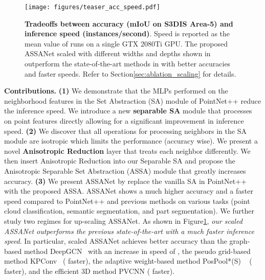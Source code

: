 \documentclass{article}
\newcommand{\figLabel}{Figure\xspace}
\newcommand{\secLabel}{Section\xspace}
\newcommand{\mysection}[1]{\vspace{3pt}\noindent\textbf{#1.}}
\begin{document}
\begin{figure}
  \begin{minipage}[c]{0.40\textwidth}
    \texttt{[image: figures/teaser\_acc\_speed.pdf]}
  \end{minipage}\hfill
  \begin{minipage}[c]{0.50\textwidth}
    \caption{
        \textbf{Tradeoffs between accuracy (mIoU on S3DIS Area-5) and inference speed (instances/second)}. Speed is reported as the mean value of  runs on a single GTX 2080Ti GPU. The proposed ASSANet scaled with different widths and depths shown in \protect{} outperform the state-of-the-art methods in \protect{} with better accuracies and faster speeds. Refer to \secLabel \ref{sec:ablation_scaling} for details. 
    }
    \label{fig:acc-latency}
  \end{minipage}
  \vspace{-5mm}
\end{figure}


\mysection{Contributions}
\textbf{(1)} We demonstrate that the MLPs performed on the neighborhood features in the Set Abstraction (SA) module of PointNet++ reduce the inference speed. We introduce a new \textbf{separable SA} module that processes on point features directly allowing for a significant improvement in inference speed. 
\textbf{(2)} We discover that all operations for processing neighbors in the SA module are isotropic which limits the performance (accuracy wise). We present a novel \textbf{Anisotropic Reduction} layer that treats each neighbor differently. We then insert Anisotropic Reduction into our Separable SA and propose the Anisotropic Separable Set Abstraction (ASSA) module that greatly increases accuracy.
\textbf{(3)} We present ASSANet by replace the vanilla SA in PointNet++ with the proposed ASSA. ASSANet shows a much higher accuracy and a faster speed compared to PointNet++ and previous methods on various tasks (point cloud classification, semantic segmentation, and part segmentation). We further study two regimes for up-scaling ASSANet. As shown in \figLabel \ref{fig:acc-latency}, \textit {our scaled ASSANet outperforms the previous state-of-the-art with a much faster inference speed}. In particular, scaled ASSANet achieves better accuracy than the graph-based method DeepGCN~\cite{Li2019DeepGCNs} with an increase in speed of , the pseudo grid-based method KPConv~\cite{Thomas2019KPConvFA} ( faster), the adaptive weight-based method PosPool*(S) ~\cite{Liu2020ACL} ( faster), and the efficient 3D method PVCNN \cite{Liu2019PointVoxelCF} ( faster).  
\end{document}
